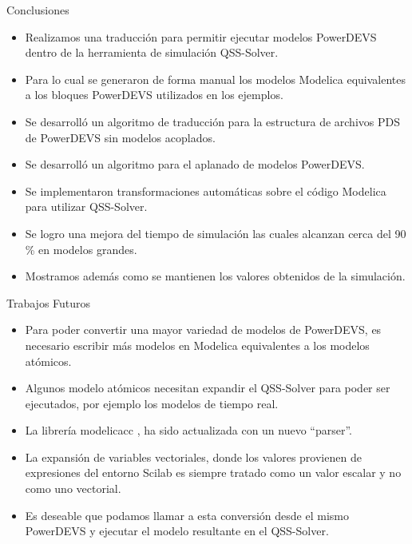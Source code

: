 \documentclass[10pt,handout]{beamer}
\newcommand{\quotes}[1]{``#1''}
\begin{document}
\begin{frame}{Conclusiones}
\begin{itemize}
\item<1-> Realizamos una traducción para permitir ejecutar modelos PowerDEVS dentro de la herramienta de simulación QSS-Solver. 
\item<2-> Para lo cual se generaron de forma manual los modelos Modelica equivalentes a los bloques PowerDEVS utilizados en los ejemplos.
\item<3-> Se desarrolló un algoritmo de traducción para la estructura de archivos PDS de PowerDEVS sin modelos acoplados.
\item<4-> Se desarrolló un algoritmo para el aplanado de modelos PowerDEVS.
\item<5-> Se implementaron transformaciones automáticas sobre el código Modelica para utilizar QSS-Solver.
\item<6-> Se logro una mejora del tiempo de simulación las cuales alcanzan cerca del 90 \% en modelos grandes.
\item<7-> Mostramos además como se mantienen los valores obtenidos de la simulación.
\end{itemize}
\end{frame}

\begin{frame}{Trabajos Futuros}
\begin{itemize}
\item Para poder convertir una mayor variedad de modelos de PowerDEVS, es necesario escribir más modelos en Modelica equivalentes a los modelos atómicos.
\item Algunos modelo atómicos necesitan expandir el QSS-Solver para poder ser ejecutados, por ejemplo los modelos de tiempo real.
\item La librería modelicacc , ha sido actualizada con un nuevo \quotes{parser}.
\item La expansión de variables vectoriales, donde los valores provienen de expresiones del entorno Scilab es siempre tratado como un valor escalar y no como uno vectorial. 
\item Es deseable que podamos llamar a esta conversión desde el mismo PowerDEVS y ejecutar el modelo resultante en el QSS-Solver.
\end{itemize}
\end{frame}
\end{document}
